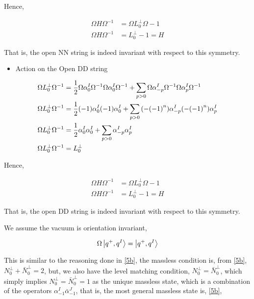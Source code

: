 Hence,

\begin{align*}
    \Omega H\Omega^{-1}&=\Omega L^\perp_0\Omega-1\\
    \Omega H\Omega^{-1}&=L^\perp_0-1=H
\end{align*}

That is, the open NN string is indeed invariant with respect to this symmetry.

\begin{itemize}
    \item Action on the Open DD string
\end{itemize}
\begin{align*}
    \Omega L^\perp_0\Omega^{-1}&=\frac12\Omega\alpha_0^I\Omega^{-1}\Omega\alpha_0^I\Omega^{-1}+\sum\limits_{p>0}\Omega\alpha^I_{-p}\Omega^{-1}\Omega\alpha^I_p\Omega^{-1}\\
    \Omega L^\perp_0\Omega^{-1}&=\frac12\qty(-1){\alpha}_0^I\qty(-1){\alpha}_0^I+\sum\limits_{p>0}\qty(-\qty(-1)^n){\alpha}^I_{-p}\qty(-\qty(-1)^n){\alpha}^I_p\\
    \Omega L^\perp_0\Omega^{-1}&=\frac12{\alpha}_0^I{\alpha}_0^I+\sum\limits_{p>0}{\alpha}^I_{-p}{\alpha}^I_p\\
    \Omega L^\perp_0\Omega^{-1}&={L}_0^\perp
\end{align*}

Hence,

\begin{align*}
    \Omega H\Omega^{-1}&=\Omega L^\perp_0\Omega-1\\
    \Omega H\Omega^{-1}&=L^\perp_0-1=H
\end{align*}

That is, the open DD string is indeed invariant with respect to this symmetry.

\probitem{}

We assume the vacuum is orientation invariant,

\begin{align*}
    \Omega\ket{q^+,q^I}=\ket{q^+,q^I}
\end{align*}

This is similar to the reasoning done in \ref{5b}, the massless condition is, from \ref{5b}, $N^\perp_0+{\bar N}^\perp_0=2$, but, 
we also have the level matching condition, $N^\perp_0={\bar N}^\perp_0$, which simply implies $N^\perp_0={\bar N}^\perp_0=1$ as the unique 
massless state, which is a combination of the operators $\alpha^I_{-1}{\bar \alpha}^J_{-1}$, that is, the most general massless state is, \ref{5b}, 

